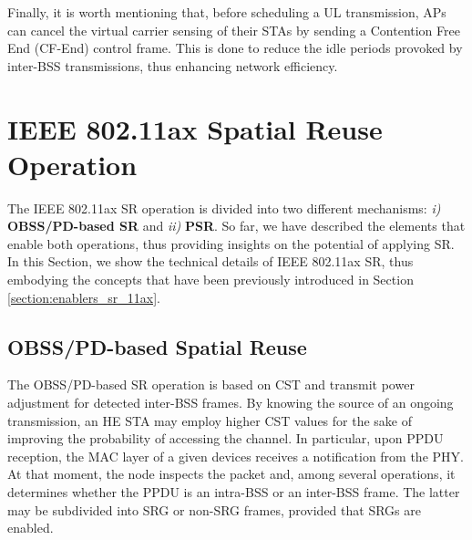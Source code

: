 \documentclass{ieeeaccess}
\begin{document}
Finally, it is worth mentioning that, before scheduling a UL transmission, APs can cancel the virtual carrier sensing of their STAs by sending a Contention Free End (CF-End) control frame. This is done to reduce the idle periods provoked by inter-BSS transmissions, thus enhancing network efficiency. 


\section{IEEE 802.11ax Spatial Reuse Operation}
\label{section:operation_sr_11ax}
The IEEE 802.11ax SR operation is divided into two different mechanisms: \emph{i)} \textbf{OBSS/PD-based SR} and \emph{ii)} \textbf{PSR}. So far, we have described the elements that enable both operations, thus providing insights on the potential of applying SR. In this Section, we show the technical details of IEEE 802.11ax SR, thus embodying the concepts that have been previously introduced in Section \ref{section:enablers_sr_11ax}.

\subsection{OBSS/PD-based Spatial Reuse}
\label{section:obss_pd_based}
The OBSS/PD-based SR operation is based on CST and transmit power adjustment for detected inter-BSS frames. By knowing the source of an ongoing transmission, an HE STA may employ higher CST values for the sake of improving the probability of accessing the channel. In particular, upon PPDU reception, the MAC layer of a given devices receives a notification from the PHY. At that moment, the node inspects the packet and, among several operations, it determines whether the PPDU is an intra-BSS or an inter-BSS frame. The latter may be subdivided into SRG or non-SRG frames, provided that SRGs are enabled.

\end{document}
